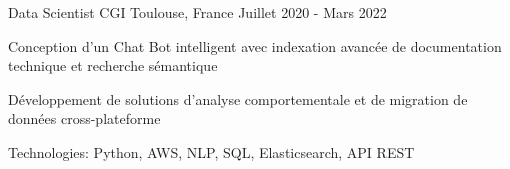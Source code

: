 \begin{cventries}
\cventry
{Data Scientist} %
{CGI} %
{Toulouse, France} %
{Juillet 2020 - Mars 2022} %
{ %
\begin{cvitems}
\item {Conception d'un Chat Bot intelligent avec indexation avancée de documentation technique et recherche sémantique}
\item {Développement de solutions d'analyse comportementale et de migration de données cross-plateforme}
\item {Technologies: Python, AWS, NLP, SQL, Elasticsearch, API REST}
\end{cvitems}
}


\end{cventries}